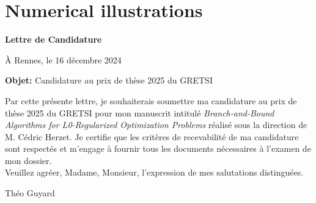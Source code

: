 \documentclass[11pt]{article}
\begin{document}
\section{Numerical illustrations}
\label{sec:numerics}




\clearpage

\thispagestyle{empty}

\vspace*{150pt}
\begin{center}
    \LARGE\bf{Lettre de Candidature}
\end{center}
\vspace*{50pt}
\begin{flushright}
    À Rennes, le 16 décembre 2024
\end{flushright}
\vspace*{20pt}
\textbf{Objet:} Candidature au prix de thèse 2025 du GRETSI

\vspace*{20pt}

Par cette présente lettre, je souhaiterais soumettre ma candidature au prix de thèse 2025 du GRETSI pour mon manuscrit intitulé \textit{Branch-and-Bound Algorithms for L0-Regularized Optimization Problems} réalisé sous la direction de M. Cédric Herzet.
Je certifie que les critères de recevabilité de ma candidature sont respectés et m'engage à fournir tous les documents nécessaires à l'examen de mon dossier.
~\\

Veuillez agréer, Madame, Monsieur, l'expression de mes salutations distinguées.

\vspace*{50pt}
\begin{flushright}
    Théo Guyard
\end{flushright}
\end{document}
